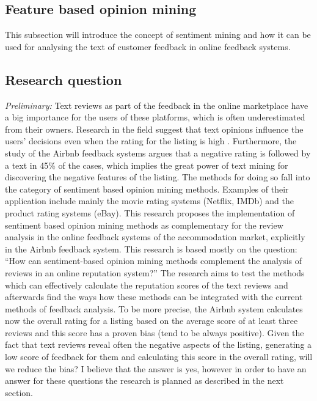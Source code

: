 \documentclass[a4paper, 11pt]{article}
\begin{document}
\subsection{Feature based opinion mining}
This subsection will introduce the concept of sentiment mining and how it can be used for analysing the text of customer feedback in online feedback systems.

\subsection{Research question}
\textit{Preliminary:} Text reviews as part of the feedback in the online marketplace have a big importance for the users of
these platforms, which is often underestimated from their owners. Research in the field suggest that text
opinions influence the users’ decisions even when the rating for the listing is high \cite{fradkin2016bias}. Furthermore, the
study of the Airbnb feedback systems argues that a negative rating is followed by a text in 45\% of the cases,
which implies the great power of text mining for discovering the negative features of the listing. The methods for doing so fall into the category of sentiment based opinion mining methods. Examples of their application include mainly the movie rating systems (Netflix, IMDb) and the product rating systems (eBay).
This research proposes the implementation of sentiment based opinion mining methods as complementary for the review analysis in the online feedback systems of the accommodation market, explicitly in the Airbnb feedback system.
This research is based mostly on the question: “How can sentiment-based opinion mining methods complement the analysis of reviews in an online reputation system?” The research aims to test the methods which can effectively calculate the reputation scores of the text reviews and afterwards find the ways how these methods can be integrated with the current methods of feedback analysis. To be more precise, the Airbnb system calculates now the overall rating for a listing based on the average score of at least three reviews and this score has a proven bias (tend to be always positive). Given the fact that text reviews reveal often the negative aspects of the listing, generating a low score of feedback for them and calculating this score in the overall rating, will we reduce the bias? I believe that the answer is yes, however in order to have an answer for these questions the research is planned as described in the next section.
\end{document}
